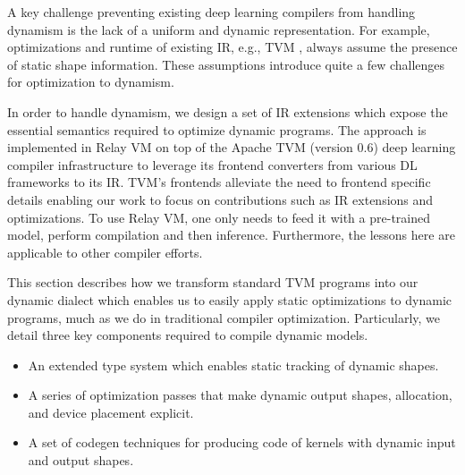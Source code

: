 A key challenge preventing existing deep learning compilers from handling dynamism is the lack of a uniform and dynamic representation. For example, optimizations and runtime of existing IR, e.g., TVM \citep{tvm_osdi18}, always assume the presence of static shape information. These assumptions introduce quite a few challenges for optimization to dynamism.

In order to handle dynamism, we design a set of IR extensions which expose the essential semantics required to optimize dynamic programs. The approach is implemented in Relay VM on top of the Apache TVM (version 0.6) deep learning compiler infrastructure \citep{tvm_osdi18} to leverage its frontend converters from various DL frameworks to its IR. TVM's frontends alleviate the need to frontend specific details enabling our work to focus on contributions such as IR extensions and optimizations. To use Relay VM, one only needs to feed it with a pre-trained model, perform compilation and then inference. Furthermore, the lessons
here are applicable to other compiler efforts.

This section describes how we transform standard TVM programs into our dynamic dialect which enables us to easily apply static optimizations to dynamic programs, much as we do in traditional compiler optimization. Particularly, we detail three key components required to compile dynamic models.

\begin{itemize}
    \item An extended type system which enables static tracking of dynamic shapes.
    \item A series of optimization passes that make dynamic output shapes, allocation, and device placement explicit.
    \item A set of codegen techniques for producing code of kernels with dynamic input and output shapes.
\end{itemize}

